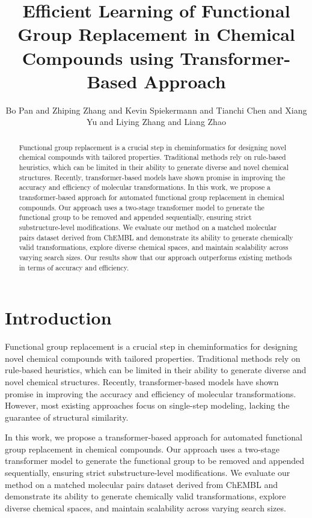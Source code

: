 \documentclass[12pt, a4paper]{article}
\begin{document}
\title{Efficient Learning of Functional Group Replacement in Chemical Compounds using Transformer-Based Approach}

\author{Bo Pan and Zhiping Zhang and Kevin Spiekermann and Tianchi Chen and Xiang Yu and Liying Zhang and Liang Zhao}

\maketitle

\begin{abstract}
Functional group replacement is a crucial step in cheminformatics for designing novel chemical compounds with tailored properties. Traditional methods rely on rule-based heuristics, which can be limited in their ability to generate diverse and novel chemical structures. Recently, transformer-based models have shown promise in improving the accuracy and efficiency of molecular transformations. In this work, we propose a transformer-based approach for automated functional group replacement in chemical compounds. Our approach uses a two-stage transformer model to generate the functional group to be removed and appended sequentially, ensuring strict substructure-level modifications. We evaluate our method on a matched molecular pairs dataset derived from ChEMBL and demonstrate its ability to generate chemically valid transformations, explore diverse chemical spaces, and maintain scalability across varying search sizes. Our results show that our approach outperforms existing methods in terms of accuracy and efficiency.
\end{abstract}

\section{Introduction}

Functional group replacement is a crucial step in cheminformatics for designing novel chemical compounds with tailored properties. Traditional methods rely on rule-based heuristics, which can be limited in their ability to generate diverse and novel chemical structures. Recently, transformer-based models have shown promise in improving the accuracy and efficiency of molecular transformations. However, most existing approaches focus on single-step modeling, lacking the guarantee of structural similarity.

In this work, we propose a transformer-based approach for automated functional group replacement in chemical compounds. Our approach uses a two-stage transformer model to generate the functional group to be removed and appended sequentially, ensuring strict substructure-level modifications. We evaluate our method on a matched molecular pairs dataset derived from ChEMBL and demonstrate its ability to generate chemically valid transformations, explore diverse chemical spaces, and maintain scalability across varying search sizes.
\end{document}
